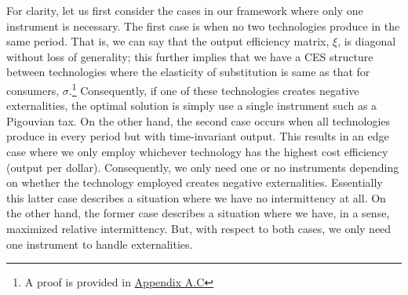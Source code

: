 \documentclass[11pt,a4paper]{extarticle}
\begin{document}
For clarity, let us first consider the cases in our framework where only one instrument is necessary. The first case is when no two technologies produce in the same period. That is, we can say that the output efficiency matrix, $\xi$, is diagonal without loss of generality; this further implies that we have a CES structure between technologies where the elasticity of substitution is same as that for consumers, $\sigma$.\footnote{A proof is provided in \hyperref[sec:CESspecialcase]{Appendix A.C}} Consequently, if one of these technologies creates negative externalities, the optimal solution is simply use a single instrument such as a Pigouvian tax. On the other hand, the second case occurs when all technologies produce in every period but with time-invariant output. This results in an edge case where we only employ whichever technology has the highest cost efficiency (output per dollar). Consequently, we only need one or no instruments depending on whether the technology employed creates negative externalities. Essentially this latter case describes a situation where we have no intermittency at all. On the other hand, the former case describes a situation where we have, in a sense, maximized relative intermittency. But, with respect to both cases, we only need one instrument to handle externalities. 
\end{document}
